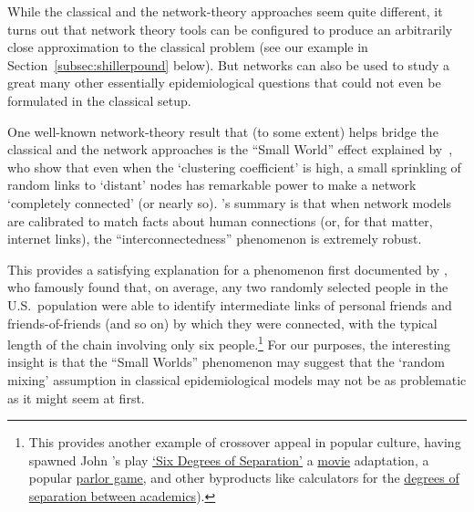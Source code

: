 While the classical and the network-theory approaches seem quite different, it turns out that network theory tools can be configured to produce an arbitrarily close approximation to the classical problem (see our example in Section~\ref{subsec:shillerpound} below).  But networks can also be used to study a great many other essentially epidemiological questions that could not even be formulated in the classical setup. %


One well-known network-theory result that (to some extent) helps bridge the classical and the network approaches is the ``Small World'' effect explained by~\cite{wsSmallWorld}, who show that even when the `clustering coefficient' is high, a small sprinkling of random links to `distant' nodes has remarkable power to make a network `completely connected' (or nearly so).  \cite{barabasi2016network}'s summary is that when network models are calibrated to match facts about human connections (or, for that matter, internet links), the ``interconnectedness'' phenomenon is extremely robust.

This provides a satisfying explanation for a phenomenon first documented by \cite{milgram1967small}, who famously found that, on average, any two randomly selected people in the U.S.\ population were able to identify intermediate links of personal friends and friends-of-friends (and so on) by which they were connected, with the typical length of the chain involving only six people.\footnote{This provides another example of crossover appeal in popular culture, having spawned John \cite{guareSixDegrees}'s play \href{https://en.wikipedia.org/wiki/Six_Degrees_of_Separation_(play)}{`Six Degrees of Separation'} a  \href{https://en.wikipedia.org/wiki/Six_Degrees_of_Separation_(film)}{movie} adaptation, a popular \href{https://en.wikipedia.org/wiki/Six_Degrees_of_Kevin_Bacon}{parlor game}, and other byproducts like calculators for the \href{https://oakland.edu/enp/}{degrees of separation between academics}).}  For our purposes, the interesting insight is that the ``Small Worlds'' phenomenon may suggest that the `random mixing' assumption in classical epidemiological models may not be as problematic as it might seem at first.

